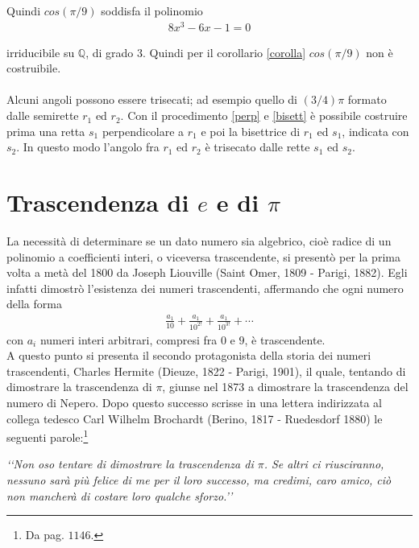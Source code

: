 Quindi $cos(\pi / 9)$ soddisfa il polinomio 
\begin{align*}
8x^3 - 6x - 1 = 0 
\end{align*}

\noindent
irriducibile su $\mathbb{Q}$, di grado $3$. Quindi per il corollario \ref{corolla} $cos(\pi / 9)$ non è costruibile.
\\\\
Alcuni angoli possono essere trisecati; ad esempio quello di $(3/4)\pi$ formato dalle semirette $r_1$ ed $r_2$. Con il procedimento \ref{perp} e \ref{bisett} è possibile costruire prima una retta $s_1$ perpendicolare a $r_1$ e poi la bisettrice di $r_1$ ed $s_1$, indicata con $s_2$. In questo modo l'angolo fra $r_1$ ed $r_2$ è trisecato dalle rette $s_1$ ed $s_2$.

\section{Trascendenza di $e$ e di $\pi$} \label{trascendenzapi}

La necessità di determinare se un dato numero sia algebrico, cioè radice di un polinomio a coefficienti interi, o viceversa trascendente, si presentò per la prima volta a metà del 1800 da Joseph Liouville (Saint Omer, 1809 - Parigi, 1882). Egli infatti dimostrò l'esistenza dei numeri trascendenti, affermando che ogni numero della forma
\begin{align*}
\frac{a_1}{10} + \frac{a_1}{10^{2!}} + \frac{a_1}{10^{3!}} + \cdots  
\end{align*}
\noindent
con ${a_i}$ numeri interi arbitrari, compresi fra $0$ e $9$, è trascendente. 
\\
A questo punto si presenta il secondo protagonista della storia dei numeri trascendenti, Charles Hermite (Dieuze, 1822 - Parigi, 1901), il quale, tentando di dimostrare la trascendenza di $\pi$, giunse nel 1873 a dimostrare la trascendenza del numero di Nepero.
Dopo questo successo scrisse in una lettera indirizzata al collega tedesco Carl Wilhelm Brochardt (Berino, 1817 - Ruedesdorf 1880) le seguenti parole:\footnote{Da \cite{kline} pag. $1146$. }

\begin{center}
\emph{ \lq\lq Non oso tentare di dimostrare la trascendenza di $\pi$. Se altri ci riusciranno, nessuno sarà più felice di me per il loro successo, ma credimi, caro amico, ciò non mancherà di costare loro qualche sforzo.\rq\rq }
\end{center}

